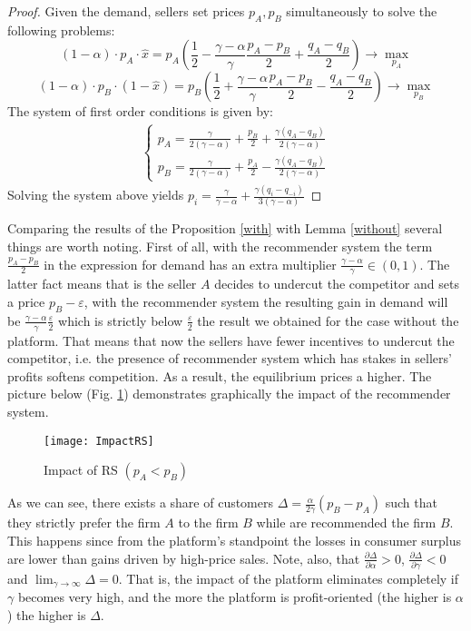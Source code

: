 \documentclass[a4paper]{article}
\begin{document}
\begin{proof}
	 
	 
	 
	 Given the demand, 	sellers set prices $p_A, p_B$ simultaneously to solve the following problems:
	 $$(1-\alpha)\cdot p_A \cdot \hat{x} = p_A \left(\frac{1}{2} - \frac{\gamma - \alpha}{\gamma} \frac{p_A - p_B}{2} + \frac{q_A - q_B}{2}\right) \to \underset{p_A}{\max}$$
	 $$(1-\alpha)\cdot p_B \cdot (1-\hat{x}) = p_B \left(\frac{1}{2} + \frac{\gamma - \alpha}{\gamma} \frac{p_A - p_B}{2} - \frac{q_A - q_B}{2}\right) \to \underset{p_B}{\max}$$
	 The system of first order conditions is given by:
	 \begin{align*}
	 \begin{cases}
	 p_A = \frac{\gamma}{2(\gamma - \alpha)} + \frac{p_B}{2} + \frac{\gamma(q_A - q_B)}{2(\gamma - \alpha)}\\
	 p_B = \frac{\gamma}{2(\gamma - \alpha)} + \frac{p_A}{2} - \frac{\gamma(q_A - q_B)}{2(\gamma - \alpha)}
	 \end{cases}
	 \end{align*}
	 Solving the system above yields $p_i = \frac{\gamma}{\gamma - \alpha} + \frac{\gamma(q_i - q_{-i})}{3(\gamma - \alpha)}$
	\end{proof}
	Comparing the results of the Proposition \ref{with} with Lemma \ref{without} several things are worth noting. First of all, with the recommender system the term $\frac{p_A-p_B}{2}$ in the expression for demand has an extra multiplier $\frac{\gamma-\alpha}{\gamma} \in (0, 1)$. The latter fact means that is the seller $A$ decides to undercut the competitor and sets a price $p_B - \varepsilon$, with the recommender system the resulting gain in demand will be $\frac{\gamma - \alpha}{\gamma} \frac{\varepsilon}{2}$ which is strictly below $\frac{\varepsilon}{2}$ the result we obtained for the case without the platform. That means that now the sellers have fewer incentives to undercut the competitor, i.e. the presence of recommender system which has stakes in sellers' profits softens competition. As a result, the equilibrium prices a higher. The picture below (Fig. \ref{fig1}) demonstrates graphically the impact of the recommender system. 
	
	\begin{figure}[H]
		\centering
		\texttt{[image: ImpactRS]}
		\caption{Impact of RS $(p_A < p_B)$}\label{fig1}
	\end{figure}
	As we can see, there exists a share of customers $\Delta = \frac{\alpha}{2 \gamma} (p_B - p_A)$ such that they strictly prefer the firm $A$ to the firm $B$ while are recommended the firm $B$. This happens since from the platform's standpoint the losses in consumer surplus are lower than gains driven by high-price sales. Note, also, that $\frac{\partial \Delta}{\partial \alpha} > 0$, $\frac{\partial \Delta}{\partial \gamma} < 0$ and $\lim_{\gamma \to \infty} \Delta = 0$. That is, the impact of the platform eliminates completely if $\gamma$ becomes very high, and the more the platform is profit-oriented (the higher is $\alpha$) the higher is $\Delta$.
\end{document}
